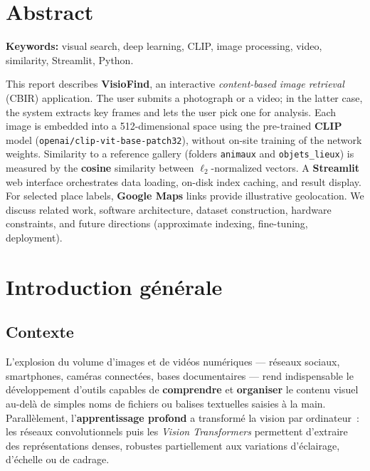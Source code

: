 \documentclass[11pt,a4paper,openany]{report}
\begin{document}
\vspace{1.2cm}

\chapter*{Abstract}

\textbf{Keywords:} visual search, deep learning, CLIP, image processing, video, similarity, Streamlit, Python.

This report describes \textbf{VisioFind}, an interactive \emph{content-based image retrieval} (CBIR) application. The user submits a photograph or a video; in the latter case, the system extracts key frames and lets the user pick one for analysis. Each image is embedded into a 512-dimensional space using the pre-trained \textbf{CLIP} model (\texttt{openai/clip-vit-base-patch32}), without on-site training of the network weights. Similarity to a reference gallery (folders \texttt{animaux} and \texttt{objets\_lieux}) is measured by the \textbf{cosine} similarity between $\ell_2$-normalized vectors. A \textbf{Streamlit} web interface orchestrates data loading, on-disk index caching, and result display. For selected place labels, \textbf{Google Maps} links provide illustrative geolocation. We discuss related work, software architecture, dataset construction, hardware constraints, and future directions (approximate indexing, fine-tuning, deployment).

\cleardoublepage

\tableofcontents
\cleardoublepage
\listoffigures
\cleardoublepage

\chapter{Introduction générale}

\section{Contexte}

L'explosion du volume d'images et de vidéos numériques — réseaux sociaux, smartphones, caméras connectées, bases documentaires — rend indispensable le développement d'outils capables de \textbf{comprendre} et \textbf{organiser} le contenu visuel au-delà de simples noms de fichiers ou balises textuelles saisies à la main. Parallèlement, l'\textbf{apprentissage profond} a transformé la vision par ordinateur~: les réseaux convolutionnels puis les \emph{Vision Transformers} permettent d'extraire des représentations denses, robustes partiellement aux variations d'éclairage, d'échelle ou de cadrage.
\end{document}
